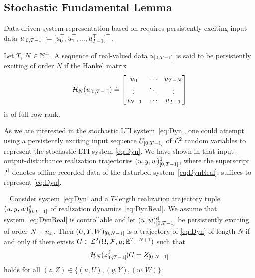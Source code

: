 \subsection{Stochastic Fundamental Lemma}
Data-driven system representation based on \citet{willems05note} requires persistently exciting input data $u_{[0,T-1]}\coloneqq [u_0^\top,u_1^\top,...,u_{T-1}^\top]^\top$.
\begin{defn} Let $T$, $N \in \mathbb{N}^+$. A sequence of real-valued data $u_{[0,T-1]}$ is said to be persistently exciting of order $N$ if the Hankel matrix
	\begin{equation*}
		\mathcal{H}_N(u_{[0,T-1]}) \doteq \begin{bmatrix}
			u_0   &\cdots& u_{T-N} \\
			\vdots & \ddots & \vdots \\
			u_{N-1}& \cdots  & u_{T-1} \\
		\end{bmatrix}
	\end{equation*}
	is of full row rank.
\end{defn}

As we are interested in the stochastic LTI system~\eqref{eq:Dyn}, one could attempt using a persistently exciting input sequence $U_{[0,T-1]}$ of $\mathcal{L}^2$ random variables to represent the stochastic LTI system \eqref{eq:Dyn}.
We have shown in \citet{pan23stochastic} that input-output-disturbance realization trajectories $(u,y,w)_{[0,T-1]}^{\mathrm{d}}$, where the superscript $\cdot^{\mathrm{d}}$ denotes offline recorded data of the disturbed system~\eqref{eq:DynReal}, suffices to represent \eqref{eq:Dyn}.

\begin{lem}\label{lem:StochFundam}~
    Consider system~\eqref{eq:Dyn} and a $T$-length realization trajectory tuple $(u,y,w)_{[0,T-1]}^{\mathrm{d}}$ of realization dynamics~\eqref{eq:DynReal}. We assume that system~\eqref{eq:DynReal} is controllable and let $(u,w)_{[0,T-1]}^{\mathrm{d}}$ be persistently exciting of order $N+{n_x}$. Then $ (U,Y,W)_{[0,N-1]}$ is a trajectory of \eqref{eq:Dyn} of length $N$ if and only if there exists $G \in \mathcal{L}^2(\Omega, \mathcal{F}, \mu; \mathbb{R}^{T-N+1}) $ such that 
	\begin{equation*}
		\mathcal{H}_N(z_{[0,T-1]}^{\mathrm{d}}) G=Z_{[0,N-1]}
	\end{equation*} 
	holds for all $(z, Z)\in \{ (u, U), (y, Y), (w, W)\}$.
\end{lem}

